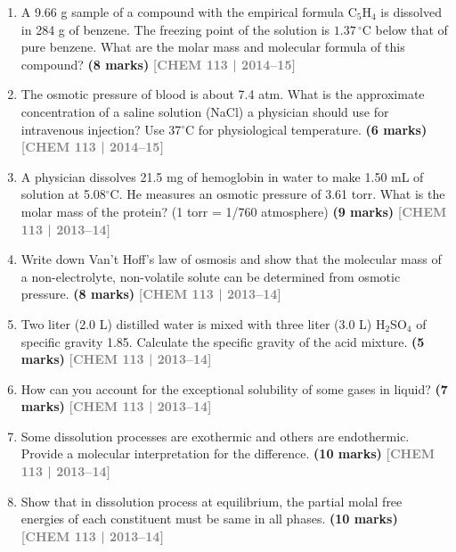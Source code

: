 \documentclass[12pt,a3paper]{article}
\newcommand{\yr}[1]{\hfill\textcolor{gray}{\small\textbf{[#1]}}}
\newcommand{\mk}[1]{\textcolor{orange!70!black}{\small\textbf{(#1 marks)}}}
\begin{document}
\begin{enumerate}
\item A 9.66 g sample of a compound with the empirical formula C$_5$H$_4$ is dissolved in 284 g of benzene. The freezing point of the solution is $1.37\,^\circ$C below that of pure benzene. What are the molar mass and molecular formula of this compound? \mk{8}
\yr{CHEM 113 | 2014--15}



\item The osmotic pressure of blood is about 7.4 atm. What is the approximate concentration of a saline solution (NaCl) a physician should use for intravenous injection? Use 37$^\circ$C for physiological temperature. \mk{6}
\yr{CHEM 113 | 2014--15}



\item A physician dissolves 21.5 mg of hemoglobin in water to make 1.50 mL of solution at 5.08$^\circ$C. He measures an osmotic pressure of 3.61 torr. What is the molar mass of the protein? (1 torr = 1/760 atmosphere) \mk{9}
\yr{CHEM 113 | 2013--14}



\item Write down Van't Hoff's law of osmosis and show that the molecular mass of a non-electrolyte, non-volatile solute can be determined from osmotic pressure. \mk{8}
\yr{CHEM 113 | 2013--14}



\item Two liter (2.0 L) distilled water is mixed with three liter (3.0 L) H$_2$SO$_4$ of specific gravity 1.85. Calculate the specific gravity of the acid mixture. \mk{5}
\yr{CHEM 113 | 2013--14}



\item How can you account for the exceptional solubility of some gases in liquid? \mk{7}
\yr{CHEM 113 | 2013--14}



\item Some dissolution processes are exothermic and others are endothermic. Provide a molecular interpretation for the difference. \mk{10}
\yr{CHEM 113 | 2013--14}



\item Show that in dissolution process at equilibrium, the partial molal free energies of each constituent must be same in all phases. \mk{10}
\yr{CHEM 113 | 2013--14}




\end{enumerate}
\end{document}
